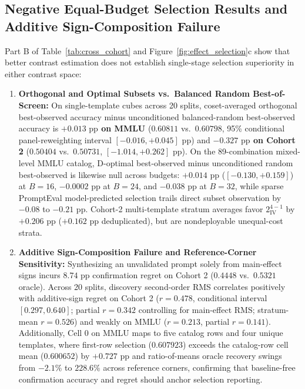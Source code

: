 \documentclass[11pt,a4paper]{article}
\begin{document}


\subsection{Negative Equal-Budget Selection Results and Additive Sign-Composition Failure}
Part B of Table~\ref{tab:cross_cohort} and Figure~\ref{fig:effect_selection}c show that better contrast estimation does not establish single-stage selection superiority in either contrast space:
\begin{enumerate}[leftmargin=*,nosep]
    \item \textbf{Orthogonal and Optimal Subsets vs.\ Balanced Random Best-of-Screen:} On single-template cubes across 20 splits, coset-averaged orthogonal best-observed accuracy minus unconditioned balanced-random best-observed accuracy is \textbf{$+0.013\text{ pp}$ on MMLU} ($0.60811$ vs.\ $0.60798$, 95\% conditional panel-reweighting interval $[-0.016, +0.045]\text{ pp}$) and \textbf{$-0.327\text{ pp}$ on Cohort 2} ($0.50404$ vs.\ $0.50731$, $[-1.014, +0.262]\text{ pp}$). On the 89-combination mixed-level MMLU catalog, D-optimal best-observed minus unconditioned random best-observed is likewise null across budgets: $+0.014\text{ pp}$ ($[-0.130, +0.159]$) at $B=16$, $-0.0002\text{ pp}$ at $B=24$, and $-0.038\text{ pp}$ at $B=32$, while sparse PromptEval model-predicted selection trails direct subset observation by $-0.08$ to $-0.21\text{ pp}$. Cohort-2 multi-template stratum averages favor $2^{4-1}_{\mathrm{IV}}$ by $+0.206\text{ pp}$ ($+0.162\text{ pp}$ deduplicated), but are nondeployable unequal-cost strata.
    \item \textbf{Additive Sign-Composition Failure and Reference-Corner Sensitivity:} Synthesizing an unvalidated prompt solely from main-effect signs incurs $8.74\text{ pp}$ confirmation regret on Cohort 2 ($0.4448$ vs.\ $0.5321$ oracle). Across 20 splits, discovery second-order RMS correlates positively with additive-sign regret on Cohort 2 ($r = 0.478$, conditional interval $[0.297, 0.640]$; partial $r = 0.342$ controlling for main-effect RMS; stratum-mean $r = 0.526$) and weakly on MMLU ($r = 0.213$, partial $r = 0.141$). Additionally, Cell 0 on MMLU maps to five catalog rows and four unique templates, where first-row selection ($0.607923$) exceeds the catalog-row cell mean ($0.600652$) by $+0.727\text{ pp}$ and ratio-of-means oracle recovery swings from $-2.1\%$ to $228.6\%$ across reference corners, confirming that baseline-free confirmation accuracy and regret should anchor selection reporting.
\end{enumerate}
\end{document}

